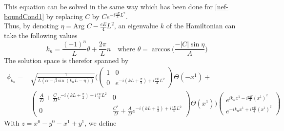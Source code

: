 This equation can be solved in the same way which has been done for \cref{nef-boundCond1} by replacing $C$ by $Ce^{-i\frac{eE}{4}L^2}$. \\
Thus, by denoting $\eta = \textrm{Arg } C - \frac{eE}{4}L^2 $, an eigenvalue $k$ of the Hamiltonian can take the following values
\begin{equation}
k_{n} = \frac{(-1)^n}{L} \theta+ \frac{2\pi}{L}n 
\quad \textrm{where $\theta = \arccos\bigg( \frac{-|C| \sin \eta}{A} \bigg)$}
\end{equation}
The solution space is therefor spanned by
\begin{equation} 
\begin{split}
\phi_{k_{n}} = 
& \sqrt{\frac{1}{L(\alpha - \beta \sin (k_{n}L - \eta))}} \Bigg( 
\begin{pmatrix}
1 & 0 \\
0  & e^{-i(kL + \frac{\pi}{2}) + i\frac{eE}{4}L^2}
\end{pmatrix}
\Theta(-x^1) + \\
& \begin{pmatrix}
\frac{A}{D}  +  \frac{C}{D} e^{-i(kL + \frac{\pi}{2})+ i\frac{eE}{4}L^2} & 0 \\
0  & \frac{C^*}{D}  + \frac{A}{D}e^{-i(kL + \frac{\pi}{2} ) + i\frac{eE}{4}L^2}
\end{pmatrix}\Theta(x^1)\Bigg)
\begin{pmatrix}
e^{ik_{n} x^1 -  i\frac{eE}{4}(x^1)^2} \\
e^{- ik_{n} x^1 + i\frac{eE}{4}(x^1)^2}
\end{pmatrix}
\end{split}
\end{equation}
With $z = x^0 - y^0 - x^1 + y^1$, we define
